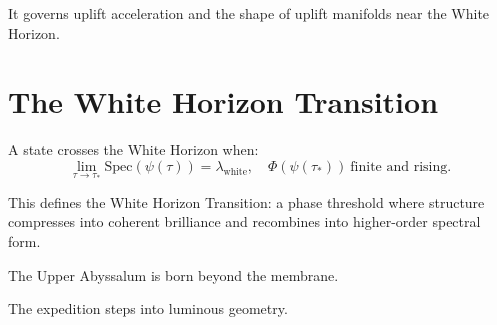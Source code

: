 It governs uplift acceleration and the shape of uplift manifolds near the White Horizon.

\section{The White Horizon Transition}
A state crosses the White Horizon when:
\[
\lim_{\tau \to \tau_*}
\mathrm{Spec}(\psi(\tau))
=
\lambda_{\mathrm{white}},
\quad
\Phi(\psi(\tau_*))\ \text{finite and rising}.
\]

This defines the White Horizon Transition: a phase threshold where structure compresses into
coherent brilliance and recombines into higher-order spectral form.

The Upper Abyssalum is born beyond the membrane.

The expedition steps into luminous geometry.

